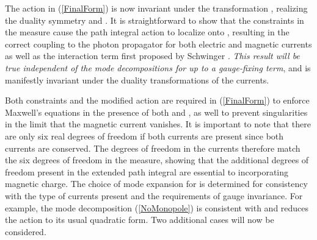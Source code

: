 \documentclass[a4paper,a4paper]{article}
\begin{document}
The action in (\ref{FinalForm}) is now invariant under the transformation \coordHE{},  realizing the duality symmetry \coordHE{} and \coordHE{}. It is straightforward to show that the constraints in the measure cause the path integral action to localize onto \coordHE{}, resulting in the correct coupling to the photon propagator for both electric and magnetic currents as well as the interaction term first proposed by Schwinger \cite{Schwinger}.  {\it This result will be true independent of the mode decompositions for \myHighlight{$\tilde{\varphi}$}\coordHE{} up to a gauge-fixing term}, and is manifestly invariant under the duality transformations of the currents.

Both constraints and the modified action are required in (\ref{FinalForm}) to enforce Maxwell's equations in the presence of both \myHighlight{$\tilde{\jmath}$}\coordHE{} and \coordHE{}, as well to prevent singularities in the limit that the magnetic current vanishes.  It is important to note that there are only six real degrees of freedom if both currents are present since both currents are conserved. The degrees of freedom in the currents therefore match the six degrees of freedom in the \myHighlight{$\tilde{\varphi}$}\coordHE{} measure, showing that the additional degrees of freedom present in the extended path integral are essential to incorporating magnetic charge.  The choice of mode expansion for \myHighlight{$\tilde{\varphi}$}\coordHE{} is determined for consistency with the type of currents present and the requirements of gauge invariance. For example, the mode decomposition (\ref{NoMonopole}) is consistent with \coordHE{} and reduces the action to its usual quadratic form.  Two additional cases will now be considered.
\end{document}

